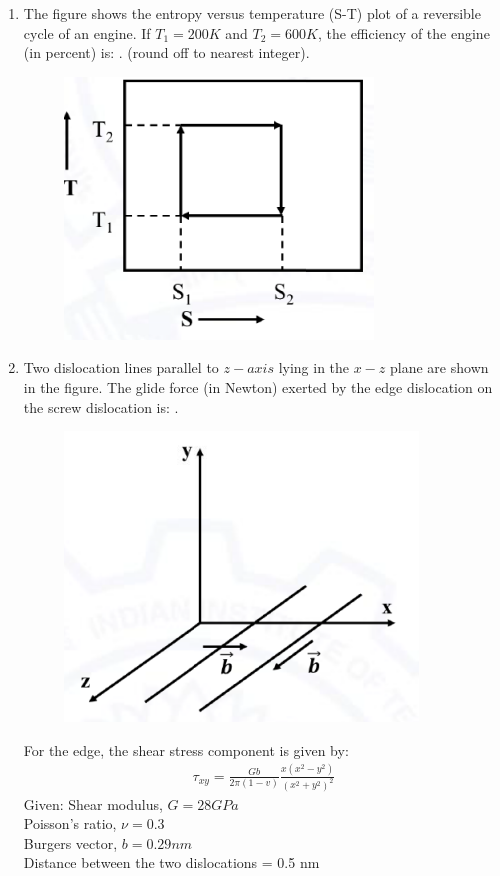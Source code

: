 \documentclass[journal]{IEEEtran}
\theoremstyle{remark}
\begin{document}
\begin{enumerate}[resume]
\item The figure shows the entropy versus temperature (S-T) plot of a reversible
cycle of an engine. If $T_1 = 200 K$ and $T_2 = 600 K$, the efficiency of the engine
(in percent) is:  \underline {\hspace{2cm}}. (round off to nearest integer). \hfill{}
\begin{figure}[H]
    \centering
    \includegraphics[width=0.5\columnwidth]{figs/Q.45.png}
    \caption{}
    \label{fig:placeholder}
\end{figure}

\item Two dislocation lines parallel to $z-axis$ lying in the $x-z$ plane are shown in
the figure. The glide force (in Newton) exerted by the edge dislocation on
the screw dislocation is:  \underline {\hspace{2cm}}.
\begin{figure}[H]
    \centering
    \includegraphics[width=0.5\columnwidth]{figs/Q.46.png}
    \caption{}
    \label{fig:placeholder}
\end{figure}
For the edge, the shear stress component is given by:
\begin{align}
    \tau_{xy}=\frac{Gb}{2\pi(1-v)}\frac{x(x^2-y^2)}{(x^2+y^2)^2}
\end{align}
Given: Shear modulus, $G = 28 GPa$\\
Poisson's ratio, $\nu = 0.3$\\
Burgers vector, $b = 0.29 nm$\\
Distance between the two dislocations = 0.5 nm


\end{enumerate}
\end{document}
